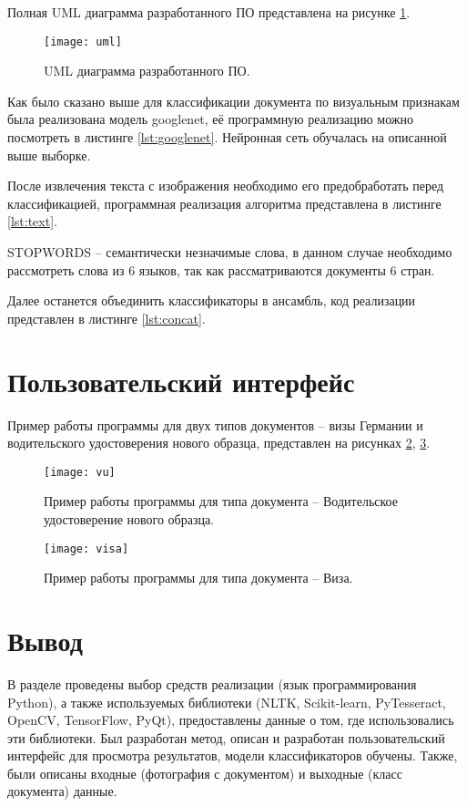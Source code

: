 Полная UML диаграмма разработанного ПО представлена на рисунке \ref{img:uml}.

\begin{figure}[H]
	\centering
	\texttt{[image: uml]}
	\caption{UML диаграмма разработанного ПО. }
	\label{img:uml}
\end{figure}

Как было сказано выше для классификации документа по визуальным признакам была реализована модель googlenet, её программную реализацию можно посмотреть в листинге \ref{lst:googlenet}. Нейронная сеть обучалась на описанной выше выборке.

После извлечения текста с изображения необходимо его предобработать перед классификацией, программная реализация алгоритма представлена в листинге \ref{lst:text}. 

STOPWORDS -- семантически незначимые слова, в данном случае необходимо рассмотреть слова из 6 языков, так как рассматриваются документы 6 стран.

Далее останется объединить классификаторы в ансамбль, код реализации представлен в листинге \ref{lst:concat}. 

\section{Пользовательский интерфейс }

Пример работы программы для двух типов документов -- визы Германии и водительского удостоверения нового образца, представлен на рисунках \ref{img:vu}, \ref{img:visa}.

\begin{figure}[H]
	\centering
	\texttt{[image: vu]}
	\caption{Пример работы программы для типа документа -- Водительское удостоверение нового образца. }
	\label{img:vu}
\end{figure}

\begin{figure}[H]
	\centering
	\texttt{[image: visa]}
	\caption{Пример работы программы для типа документа -- Виза. }
	\label{img:visa}
\end{figure}

\section{Вывод}

В разделе проведены выбор средств реализации (язык программирования Python), а также используемых библиотеки (NLTK, Scikit-learn, PyTesseract, OpenCV, TensorFlow, PyQt), предоставлены данные о том, где использовались эти библиотеки. Был разработан метод, описан и разработан пользовательский интерфейс для просмотра результатов, модели классификаторов обучены. Также, были описаны входные (фотография с документом) и выходные (класс документа) данные.
